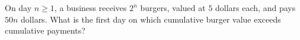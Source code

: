 On day $n\ge1$, a business receives $2^n$ burgers, valued at $5$ dollars each, and pays $50n$ dollars. What is the first day on which cumulative burger value exceeds cumulative payments?
